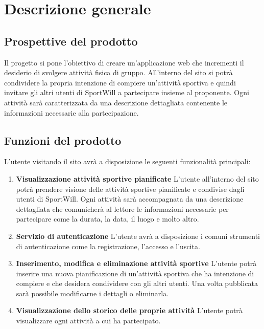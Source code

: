 \section{Descrizione generale}

\subsection{Prospettive del prodotto}

Il progetto si pone l’obiettivo di creare un'applicazione web che incrementi il desiderio di svolgere attività fisica di gruppo. All'interno del sito si potrà condividere la propria intenzione di compiere un'attività sportiva e quindi invitare gli altri utenti di SportWill a partecipare insieme al proponente. Ogni attività sarà caratterizzata da una descrizione dettagliata contenente le informazioni necessarie alla partecipazione. 

\subsection{Funzioni del prodotto}

L’utente visitando il sito avrà a disposizione le seguenti funzionalità principali:
\begin{enumerate}
    \item 
    \textbf{Visualizzazione attività sportive pianificate} \newline 
    L'utente all'interno del sito potrà prendere visione delle attività sportive pianificate e condivise dagli utenti di SportWill. Ogni attività sarà accompagnata da una descrizione dettagliata che comunicherà al lettore le informazioni necessarie per partecipare come la durata, la data, il luogo e molto altro.

 
    \item
    \textbf{Servizio di autenticazione} \newline
    L'utente avrà a disposizione i comuni strumenti di autenticazione come la registrazione, l'accesso e l'uscita. 
    
    \item
    \textbf{Inserimento, modifica e eliminazione attività sportive} \newline
    L'utente potrà inserire una nuova pianificazione di un'attività sportiva che ha intenzione di compiere e che desidera condividere con gli altri utenti. Una volta pubblicata sarà possibile modificarne i dettagli o eliminarla. 
    \item
    
      \textbf{Visualizzazione dello storico delle proprie attività} \newline
    L'utente potrà visualizzare ogni attività a cui ha partecipato.

    
    
\end{enumerate}

